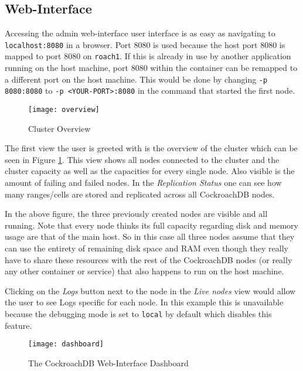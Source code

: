 \subsection{Web-Interface}\label{chap:web-interface}
Accessing the admin web-interface user interface is as easy as navigating to \verb|localhost:8080| in a browser. Port 8080 is used because the host port 8080 is mapped to port 8080 on \verb|roach1|. If this is already in use by another application running on the host machine, port 8080 within the container can be remapped to a different port on the host machine. This would be done by changing \verb|-p 8080:8080| to \verb|-p <YOUR-PORT>:8080| in the command that started the first node.

\begin{figure}[H]
    \caption{Cluster Overview}
    \texttt{[image: overview]}
    \label{fig:overview}
\end{figure}

The first view the user is greeted with is the overview of the cluster which can be seen in Figure \ref{fig:overview}. This view shows all nodes connected to the cluster and the cluster capacity as well as the capacities for every single node.
Also visible is the amount of failing and failed nodes. In the \emph{Replication Status} one can see how many ranges/cells are stored and replicated across all CockroachDB nodes. 

\medskip
In the above figure, the three previously created nodes are visible and all running. Note that every node thinks its full capacity regarding disk and memory usage are that of the main host. So in this case all three nodes assume that they can use the entirety of remaining disk space and RAM even though they really have to share these resources with the rest of the CockroachDB nodes (or really any other container or service) that also happens to run on the host machine.  

\medskip
Clicking on the \emph{Logs} button next to the node in the \emph{Live nodes} view would allow the user to see Logs specific for each node. In this example this is unavailable because the debugging mode is set to \verb|local| by default which disables this feature.

\begin{figure}[H]
    \centering
    \caption{The CockroachDB Web-Interface Dashboard}
    \texttt{[image: dashboard]}
    \label{fig:dashboard}
\end{figure}

